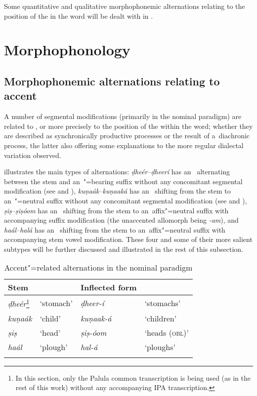 Some quantitative and qualitative morphophonemic alternations relating to the position of the  in the word will be dealt with in .


\section{Morphophonology}
\label{sec:3-5}

\subsection{Morphophonemic alternations relating to accent}
\label{subsec:3-5-1}

A number of segmental modifications (primarily in the nominal paradigm) are related to , or more precisely to the position of the  within the word; whether they are described as synchronically productive processes or the result of a~diachronic process, the latter also offering some explanations to the more regular dialectal variation observed. 



 illustrates the main types of alternations: \textit{ḍheér--ḍheerí} has an~ alternating between the stem and an~"=bearing suffix without any concomitant segmental modification (see  and ), \textit{kuṇaák--kuṇaaká} has an~ shifting from the stem to an~"=neutral suffix without any concomitant segmental modification (see  and ), \textit{ṣiṣ--ṣiṣóom} has an~ shifting from the stem to an~affix"=neutral suffix with accompanying suffix modification (the unaccented allomorph being \textit{-am}), and \textit{haál--halá} has an~ shifting from the stem to an~affix"=neutral suffix with accompanying stem vowel modification. These four and some of their more salient subtypes will be further discussed and illustrated in the rest of this subsection.


\begin{table}
\caption{ Accent"=related alternations in the nominal paradigm}
\begin{tabularx}{\textwidth}{ l@{\hspace{30pt}} Q Q Q }
\lsptoprule
Stem &
&
Inflected form &
\\\midrule
\textit{ḍheér}\footnote{In this section, only the Palula common transcription is being used (as in the rest of this work) without any accompanying IPA transcription.} &
`stomach' &
\textit{ḍheer-í} &
`stomachs'\\
\textit{kuṇaák} &
`child' &
\textit{kuṇaak-á} &
`children'\\
\textit{ṣiṣ} &
`head' &
\textit{ṣiṣ-óom} &
`heads (\textsc{obl)}'\\
\textit{haál} &
`plough' &
\textit{hal-á} &
`ploughs'\\\lspbottomrule
\end{tabularx}
\label{tab:3-7}
\end{table}


